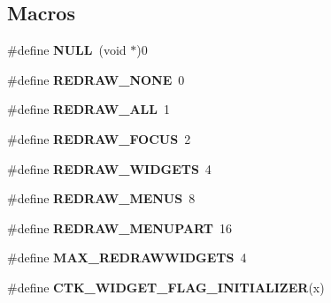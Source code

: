 \subsection*{Macros}
\begin{DoxyCompactItemize}
\item 
\hypertarget{group__ctk_ga070d2ce7b6bb7e5c05602aa8c308d0c4}{}\#define {\bfseries N\+U\+L\+L}~(void $\ast$)0\label{group__ctk_ga070d2ce7b6bb7e5c05602aa8c308d0c4}

\item 
\hypertarget{group__ctk_gaeef8a9ef1434bead376702c12ffad214}{}\#define {\bfseries R\+E\+D\+R\+A\+W\+\_\+\+N\+O\+N\+E}~0\label{group__ctk_gaeef8a9ef1434bead376702c12ffad214}

\item 
\hypertarget{group__ctk_ga30c9342babbf6d8bf629cbccdcc9d784}{}\#define {\bfseries R\+E\+D\+R\+A\+W\+\_\+\+A\+L\+L}~1\label{group__ctk_ga30c9342babbf6d8bf629cbccdcc9d784}

\item 
\hypertarget{group__ctk_ga4549b68e463359047f74e14e7d8ef279}{}\#define {\bfseries R\+E\+D\+R\+A\+W\+\_\+\+F\+O\+C\+U\+S}~2\label{group__ctk_ga4549b68e463359047f74e14e7d8ef279}

\item 
\hypertarget{group__ctk_gaddc03e9e45e266b1aa2f65064cdbf990}{}\#define {\bfseries R\+E\+D\+R\+A\+W\+\_\+\+W\+I\+D\+G\+E\+T\+S}~4\label{group__ctk_gaddc03e9e45e266b1aa2f65064cdbf990}

\item 
\hypertarget{group__ctk_ga2ec34d503308faede33e60f95d184ad2}{}\#define {\bfseries R\+E\+D\+R\+A\+W\+\_\+\+M\+E\+N\+U\+S}~8\label{group__ctk_ga2ec34d503308faede33e60f95d184ad2}

\item 
\hypertarget{group__ctk_ga35d6e7efebdb4c1faa1bb7adcf86baa3}{}\#define {\bfseries R\+E\+D\+R\+A\+W\+\_\+\+M\+E\+N\+U\+P\+A\+R\+T}~16\label{group__ctk_ga35d6e7efebdb4c1faa1bb7adcf86baa3}

\item 
\hypertarget{group__ctk_ga8cfa9d06f0cef08467d3563580bc6506}{}\#define {\bfseries M\+A\+X\+\_\+\+R\+E\+D\+R\+A\+W\+W\+I\+D\+G\+E\+T\+S}~4\label{group__ctk_ga8cfa9d06f0cef08467d3563580bc6506}

\item 
\hypertarget{group__ctk_ga3fecc6ce20608e0aecbd8cab511d988f}{}\#define {\bfseries C\+T\+K\+\_\+\+W\+I\+D\+G\+E\+T\+\_\+\+F\+L\+A\+G\+\_\+\+I\+N\+I\+T\+I\+A\+L\+I\+Z\+E\+R}(x)\label{group__ctk_ga3fecc6ce20608e0aecbd8cab511d988f}


\end{DoxyCompactItemize}
